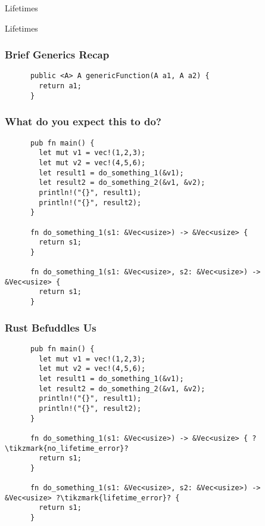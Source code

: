 \begin{section}{Lifetimes}


  \begin{frame}
    \centerline{
      \huge{Lifetimes}
    }
  \end{frame}

  \begin{frame}[fragile]
    \frametitle{Brief Generics Recap}
    \begin{verbatim}
      public <A> A genericFunction(A a1, A a2) {
        return a1;
      }
    \end{verbatim}
  \end{frame}

  \begin{frame}[fragile]
    \frametitle{What do you expect this to do? \cite{RustLangEd}}
    \begin{verbatim}
      pub fn main() {
        let mut v1 = vec!(1,2,3);
        let mut v2 = vec!(4,5,6);
        let result1 = do_something_1(&v1);
        let result2 = do_something_2(&v1, &v2);
        println!("{}", result1);
        println!("{}", result2);
      }

      fn do_something_1(s1: &Vec<usize>) -> &Vec<usize> {
        return s1;
      }

      fn do_something_1(s1: &Vec<usize>, s2: &Vec<usize>) -> &Vec<usize> {
        return s1;
      }
    \end{verbatim}
  \end{frame}

  \begin{frame}[fragile]
    \frametitle{Rust Befuddles Us}
    \begin{verbatim}
      pub fn main() {
        let mut v1 = vec!(1,2,3);
        let mut v2 = vec!(4,5,6);
        let result1 = do_something_1(&v1);
        let result2 = do_something_2(&v1, &v2);
        println!("{}", result1);
        println!("{}", result2);
      }

      fn do_something_1(s1: &Vec<usize>) -> &Vec<usize> { ?\tikzmark{no_lifetime_error}?
        return s1;
      }

      fn do_something_1(s1: &Vec<usize>, s2: &Vec<usize>) -> &Vec<usize> ?\tikzmark{lifetime_error}? {
        return s1;
      }
    \end{verbatim}
  \end{frame}


\end{section}
